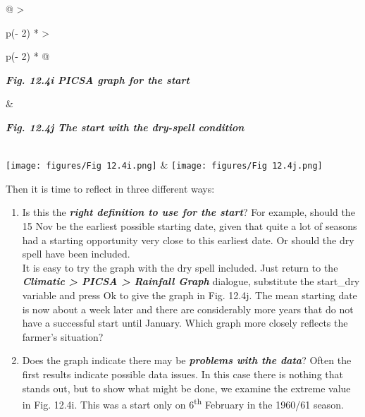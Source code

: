 \documentclass[
  letterpaper,
  DIV=11,
  numbers=noendperiod]{scrreprt}
\begin{document}
\begin{longtable}[]{@{}
  >{\raggedright\arraybackslash}p{(\columnwidth - 2\tabcolsep) * }
  >{\raggedright\arraybackslash}p{(\columnwidth - 2\tabcolsep) * }@{}}
\toprule\noalign{}
\begin{minipage}[b]{\linewidth}\raggedright
\textbf{\emph{Fig. 12.4i PICSA graph for the start}}
\end{minipage} & \begin{minipage}[b]{\linewidth}\raggedright
\textbf{\emph{Fig. 12.4j The start with the dry-spell condition}}
\end{minipage} \\
\midrule\noalign{}
\endhead
\bottomrule\noalign{}
\endlastfoot
\texttt{[image: figures/Fig 12.4i.png]}
&
\texttt{[image: figures/Fig 12.4j.png]} \\
\end{longtable}

Then it is time to reflect in three different ways:

\begin{enumerate}
\def\labelenumi{\alph{enumi})}
\item
  Is this the \textbf{\emph{right definition to use for the start}}? For
  example, should the 15 Nov be the earliest possible starting date,
  given that quite a lot of seasons had a starting opportunity very
  close to this earliest date. Or should the dry spell have been
  included.\\
  It is easy to try the graph with the dry spell included. Just return
  to the \textbf{\emph{Climatic \textgreater{} PICSA \textgreater{}
  Rainfall Graph}} dialogue, substitute the start\_dry variable and
  press Ok to give the graph in Fig. 12.4j. The mean starting date is
  now about a week later and there are considerably more years that do
  not have a successful start until January. Which graph more closely
  reflects the farmer's situation?
\item
  Does the graph indicate there may be \textbf{\emph{problems with the
  data}}? Often the first results indicate possible data issues. In this
  case there is nothing that stands out, but to show what might be done,
  we examine the extreme value in Fig. 12.4i. This was a start only on
  6\textsuperscript{th} February in the 1960/61 season.
\end{enumerate}
\end{document}
